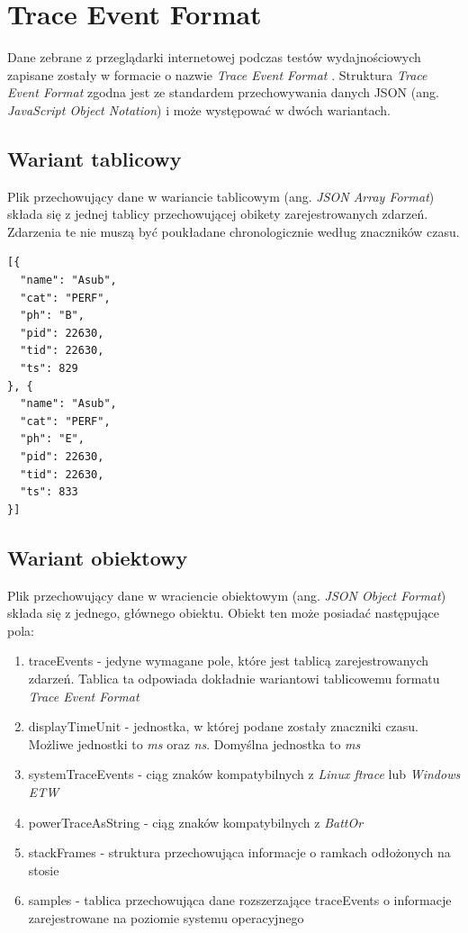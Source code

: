 \documentclass[polish, twoside, 12pt]{mwart}
\let\stdsection\section
\renewcommand*{\section}{\clearpage\stdsection}
\begin{document}
\section{Trace Event Format} \label{trace-event-format-section}

Dane zebrane z przeglądarki internetowej podczas testów wydajnościowych zapisane zostały w formacie o nazwie \emph{Trace Event Format} \cite{trace-event-format}. Struktura \emph{Trace Event Format} zgodna jest ze standardem przechowywania danych JSON (ang. \emph{JavaScript Object Notation}) \cite{json} i może występować w dwóch wariantach.

\subsection{Wariant tablicowy}

Plik przechowujący dane w wariancie tablicowym (ang. \emph{JSON Array Format}) składa się z jednej tablicy przechowującej obikety zarejestrowanych zdarzeń. Zdarzenia te nie muszą być poukładane chronologicznie według znaczników czasu. 

\begin{lstlisting}[caption=Przykładowy wariant tablicowy]
[{
  "name": "Asub",
  "cat": "PERF",
  "ph": "B",
  "pid": 22630,
  "tid": 22630,
  "ts": 829
}, {
  "name": "Asub",
  "cat": "PERF",
  "ph": "E",
  "pid": 22630,
  "tid": 22630,
  "ts": 833
}]
\end{lstlisting}

\subsection{Wariant obiektowy}

Plik przechowujący dane w wraciencie obiektowym (ang. \emph{JSON Object Format}) składa się z jednego, głównego obiektu. Obiekt ten może posiadać następujące pola:

\begin{enumerate}
  \item traceEvents - jedyne wymagane pole, które jest tablicą zarejestrowanych zdarzeń. Tablica ta odpowiada dokładnie wariantowi tablicowemu formatu \emph{Trace Event Format}
  \item displayTimeUnit - jednostka, w której podane zostały znaczniki czasu. Możliwe jednostki to \emph{ms} oraz \emph{ns}. Domyślna jednostka to \emph{ms}
  \item systemTraceEvents - ciąg znaków kompatybilnych z \emph{Linux ftrace} \cite{ftrace} lub \emph{Windows ETW} \cite{etw}
  \item powerTraceAsString - ciąg znaków kompatybilnych z \emph{BattOr} \cite {battor}
  \item stackFrames - struktura przechowująca informacje o ramkach odłożonych na stosie
  \item samples - tablica przechowująca dane rozszerzające traceEvents o informacje zarejestrowane na poziomie systemu operacyjnego 
\end{enumerate}
\end{document}
